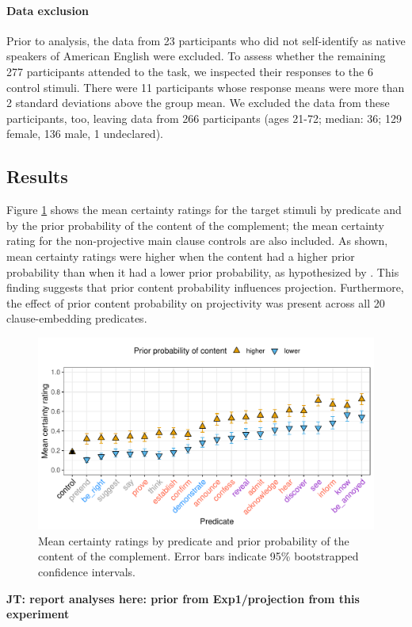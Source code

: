 \documentclass[11pt,fleqn]{article}
\newcommand{\6}{\mbox{$[\hspace*{-.6mm}[$}}
\newcommand{\9}{\mbox{$]\hspace*{-.6mm}]$}}
\newcommand{\jt}[1]{\textbf{\color{blue}JT: #1}}
\begin{document}
\paragraph{Data exclusion}
Prior to analysis, the data from 23 participants who did not self-identify as native speakers of American English were excluded. To assess whether the remaining 277 participants attended to the task, we inspected their responses to the 6 control stimuli. There were 11 participants whose response means were more than 2 standard deviations above the group mean. We excluded the data from these participants, too, leaving data from 266 participants (ages 21-72; median: 36; 129 female, 136 male, 1 undeclared).

\subsection{Results}

Figure \ref{f-projection2} shows the mean certainty ratings for the target stimuli by predicate and by the prior probability of the content of the complement; the mean certainty rating for the non-projective main clause controls are also included. As shown, mean certainty ratings were higher when the content had a higher prior probability than when it had a lower prior probability, as hypothesized by \citet{tbd-variability}. This finding suggests that prior content probability influences projection. Furthermore, the effect of prior content probability on projectivity was present across all 20 clause-embedding predicates.

\begin{figure}[H]
\centering

\includegraphics[width=.75\paperwidth]{../../results/3-projectivity/graphs/means-projectivity-by-predicate-and-facttype}

\caption{Mean certainty ratings by predicate and prior probability of the content of the complement. Error bars indicate 95\% bootstrapped confidence intervals.} 
\label{f-projection2}
\end{figure}

\jt{report analyses here: prior from Exp1/projection from this experiment}
\end{document}

